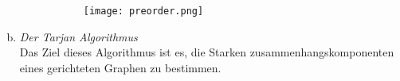 \documentclass[11pt]{article}
\begin{document}
\begin{enumerate}[a)]
\begin{description}
        \begin{figure}[h!]
          \centering
          \texttt{[image: preorder.png]}
          \label{fig:preorder}
        \end{figure}
        
        
        \end{description}
\newpage

      \item \emph{Der Tarjan Algorithmus} \\
        Das Ziel dieses Algorithmus ist es, die Starken zusammenhangskomponenten
        eines gerichteten Graphen zu bestimmen.


\end{enumerate} 
\end{document}
